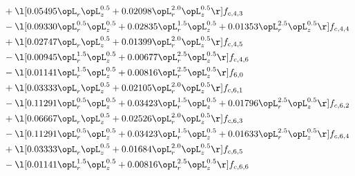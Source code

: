 \begin{alignat}{2}
& + \l[  0.05495 \opL_r \opL_z^{0.5} +  0.02098 \opL_r^{2.0} \opL_z^{0.5}  \r] f_{c,4,3} \nonumber \\ 
& - \l[  0.09330 \opL_r^{0.5} \opL_z^{0.5} +  0.02835 \opL_r^{1.5} \opL_z^{0.5} +  0.01353 \opL_r^{2.5} \opL_z^{0.5}  \r] f_{c,4,4} \nonumber \\ 
& + \l[  0.02747 \opL_r \opL_z^{0.5} +  0.01399 \opL_r^{2.0} \opL_z^{0.5}  \r] f_{c,4,5} \nonumber \\ 
& - \l[  0.00945 \opL_r^{1.5} \opL_z^{0.5} +  0.00677 \opL_r^{2.5} \opL_z^{0.5}  \r] f_{c,4,6} \nonumber \\ 
& - \l[  0.01141 \opL_r^{1.5} \opL_z^{0.5} +  0.00816 \opL_r^{2.5} \opL_z^{0.5}  \r] f_{6,0} \nonumber \\ 
& + \l[  0.03333 \opL_r \opL_z^{0.5} +  0.02105 \opL_r^{2.0} \opL_z^{0.5}  \r] f_{c,6,1} \nonumber \\ 
& - \l[  0.11291 \opL_r^{0.5} \opL_z^{0.5} +  0.03423 \opL_r^{1.5} \opL_z^{0.5} +  0.01796 \opL_r^{2.5} \opL_z^{0.5}  \r] f_{c,6,2} \nonumber \\ 
& + \l[  0.06667 \opL_r \opL_z^{0.5} +  0.02526 \opL_r^{2.0} \opL_z^{0.5}  \r] f_{c,6,3} \nonumber \\ 
& - \l[  0.11291 \opL_r^{0.5} \opL_z^{0.5} +  0.03423 \opL_r^{1.5} \opL_z^{0.5} +  0.01633 \opL_r^{2.5} \opL_z^{0.5}  \r] f_{c,6,4} \nonumber \\ 
& + \l[  0.03333 \opL_r \opL_z^{0.5} +  0.01684 \opL_r^{2.0} \opL_z^{0.5}  \r] f_{c,6,5} \nonumber \\ 
& - \l[  0.01141 \opL_r^{1.5} \opL_z^{0.5} +  0.00816 \opL_r^{2.5} \opL_z^{0.5}  \r] f_{c,6,6} \nonumber \\ 
\end{alignat} 


